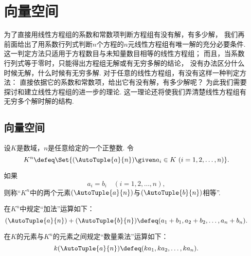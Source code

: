 \section{向量空间}
为了直接用线性方程组的系数和常数项判断方程组有没有解，有多少解，
我们再前面给出了用系数行列式判断\(n\)个方程的\(n\)元线性方程组有唯一解的充分必要条件.
这一判定方法只适用于方程数目与未知量数目相等的线性方程组；
而且，当系数行列式等于零时，只能得出方程组无解或有无穷多解的结论，
没有办法区分什么时候无解，什么时候有无穷多解.
对于任意的线性方程组，有没有这样一种判定方法：
直接依据它的系数和常数项，给出它有没有解，有多少解呢？
为此我们需要探讨和建立线性方程组的进一步的理论.
这一理论还将使我们弄清楚线性方程组有无穷多个解时解的结构.

\subsection{向量空间}
设\(K\)是数域，\(n\)是任意给定的一个正整数.
令\[
	K^n \defeq \Set{ (\AutoTuple{a}{n}) \given a_i \in K\ (i=1,2,\dotsc,n) }.
\]

如果\[
	a_i=b_i
	\quad(i=1,2,\dotsc,n),
\]
则称“\(K^n\)中的两个元素\((\AutoTuple{a}{n})\)与\((\AutoTuple{b}{n})\)相等”.

在\(K^n\)中规定“加法”运算如下：
\begin{equation}\label{equation:向量空间.向量的加法.定义式}
	(\AutoTuple{a}{n}) + (\AutoTuple{b}{n})
	\defeq (a_1+b_1,a_2+b_2,\dotsc,a_n+b_n).
\end{equation}

在\(K\)的元素与\(K^n\)的元素之间规定“数量乘法”运算如下：
\begin{equation}\label{equation:向量空间.向量的数量乘法.定义式}
	k (\AutoTuple{a}{n})
	\defeq (k a_1,k a_2,\dotsc,k a_n).
\end{equation}

